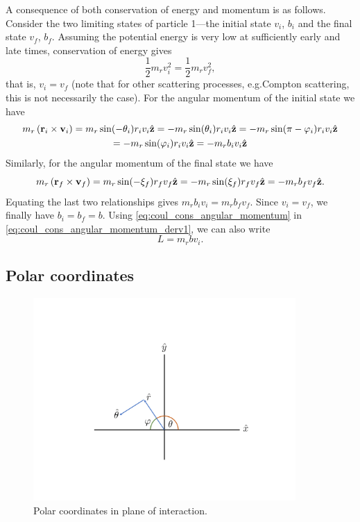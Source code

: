 \documentclass[a4paper,11pt]{report}
\begin{document}
A consequence of both conservation of energy and momentum is as follows. Consider the two limiting states of particle 1---the initial state $v_i$, $b_i$ and the final state $v_f$, $b_f$. Assuming the potential energy is very low at sufficiently early and late times, conservation of energy gives
\begin{equation}
    \frac{1}{2} m_r v_i^2 = \frac{1}{2} m_r v_f^2,
\end{equation}
that is, $v_i=v_f$ (note that for other scattering processes, e.g.\@ Compton scattering, this is not necessarily the case). For the angular momentum of the initial state we have
\begin{multline}
    \label{eq:coul_cons_angular_momentum_derv1}
    m_r \left ( \mathbf{r}_i \times \mathbf{v}_i \right ) = m_r \sin(-\theta_i) r_i v_i \hat{\mathbf{z}} = - m_r \sin(\theta_i) r_i v_i \hat{\mathbf{z}} = - m_r \sin(\pi - \varphi_i) r_i v_i \hat{\mathbf{z}} \\
    = - m_r \sin(\varphi_i) r_i v_i \hat{\mathbf{z}} = -m_r b_i v_i \hat{\mathbf{z}}
\end{multline}
Similarly, for the angular momentum of the final state we have
\begin{equation}
    m_r \left ( \mathbf{r}_f \times \mathbf{v}_f \right ) = m_r \sin(-\xi_f) r_f v_f  \hat{\mathbf{z}} = - m_r \sin(\xi_f) r_f v_f \hat{\mathbf{z}} = - m_r b_f v_f \hat{\mathbf{z}}.
\end{equation}
Equating the last two relationships gives $m_r b_i v_i = m_r b_f v_f$. Since $v_i = v_f$, we finally have $b_i = b_f = b$. Using \cref{eq:coul_cons_angular_momentum} in \cref{eq:coul_cons_angular_momentum_derv1}, we can also write
\begin{equation}
    \label{eq:coul_cons_angular_momentum_mag}
    L = m_r b v_i.
\end{equation}

\subsection{Polar coordinates}
\begin{figure}[ht]
    \centering
    \includegraphics[width=10cm]{../../images/polar_coordinates.pdf}
    \caption{Polar coordinates in plane of interaction.}
    \label{fig:polar_coordinates}
\end{figure}
\end{document}

